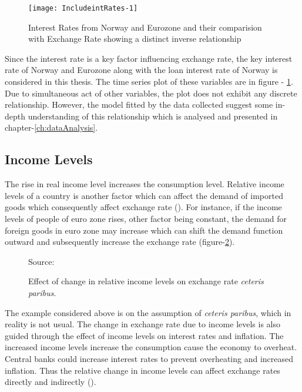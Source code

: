 \documentclass[12pt, lot, lof]{thesis}\usepackage[]{graphicx}\usepackage[]{color}
\makeatletter
\def\maxwidth{ %
  \ifdim\Gin@nat@width>\linewidth
    \linewidth
  \else
    \Gin@nat@width
  \fi
}
\makeatother
\begin{document}
\begin{Schunk}
\begin{figure}[!htbp]

{\centering \texttt{[image: IncludeintRates-1]} 

}

\caption[Interest Rates from Norway and Eurozone and their comparision with Exchange Rate showing a distinct inverse relationship]{Interest Rates from Norway and Eurozone and their comparision with Exchange Rate showing a distinct inverse relationship\label{fig:intRates}}
\end{figure}
\end{Schunk}

Since the interest rate is a key factor influencing exchange rate, the key interest rate of Norway and Eurozone along with the loan interest rate of Norway is considered in this thesis. The time series plot of these variables are in figure - \ref{fig:intRates}. Due to simultaneous act of other variables, the plot does not exhibit any discrete relationship. However, the model fitted by the data collected suggest some in-depth understanding of this relationship which is analysed and presented in chapter-\ref{ch:dataAnalysis}.

\subsection{Income Levels}
\label{ssec:incLevels}

The rise in real income level increases the consumption level. Relative income levels of a country is another factor which can affect the demand of imported goods which consequently affect exchange rate (\cite{madura2012international}). For instance, if the income levels of people of euro zone rises, other factor being constant, the demand for foreign goods in euro zone may increase which can shift the demand function outward and subsequently increase the exchange rate (figure-\ref{fig:incEffect}).

\begin{figure}[ht]
\centering
    
    \flushright\scriptsize{Source: \cite{madura2012international}}
    \caption{Effect of change in relative income levels on exchange rate \textit{ceteris paribus}.}
    \label{fig:incEffect}
\end{figure}

The example considered above is on the assumption of \textit{ceteris paribus}, which in reality is not usual. The change in exchange rate due to income levels is also guided through the effect of income levels on interest rates and inflation. The increased income levels increase the consumption cause the economy to overheat. Central banks could increase interest rates to prevent overheating and increased inflation. Thus the relative change in income levels can affect exchange rates directly and indirectly (\cite[p.~106]{madura2012international}).
\end{document}
